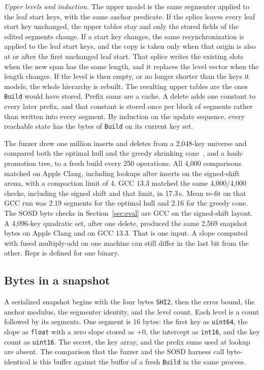 \documentclass[conference]{IEEEtran}
\begin{document}
\emph{Upper levels and induction.}
The upper model is the same segmenter applied to the leaf start keys, with the same anchor predicate.
If the splice leaves every leaf start key unchanged, the upper tables stay and only the stored fields of the edited segments change.
If a start key changes, the same resynchronization is applied to the leaf start keys, and the copy is taken only when that origin is also at or after the first unchanged leaf start.
That splice writes the existing slots when the new span has the same length, and it replaces the level vector when the length changes.
If the level is then empty, or no longer shorter than the keys it models, the whole hierarchy is rebuilt.
The resulting upper tables are the ones \texttt{Build} would have stored.
Prefix sums are a cache. A delete adds one constant to every later prefix, and that constant is stored once per block of segments rather than written into every segment.
By induction on the update sequence, every reachable state has the bytes of \texttt{Build} on its current key set.

The fuzzer drew one million inserts and deletes from a 2{,}048-key universe and compared both the optimal hull and the greedy shrinking cone~\cite{galakatos2019fiting}, and a hash-promotion tree, to a fresh build every 250 operations.
All 4{,}000 comparisons matched on Apple Clang, including lookups after inserts on the signed-shift arena, with a compaction limit of 4.
GCC 13.3 matched the same 4{,}000/4{,}000 checks, including the signed shift and that limit, in 17.3\,s.
Mean re-fit on that GCC run was 2.19 segments for the optimal hull and 2.16 for the greedy cone.
The SOSD byte checks in Section~\ref{sec:eval} are GCC on the signed-shift layout.
A 4{,}096-key quadratic set, after one delete, produced the same 2{,}569 snapshot bytes on Apple Clang and on GCC 13.3.
That is one input.
A slope computed with fused multiply-add on one machine can still differ in the last bit from the other.
$\mathrm{Repr}$ is defined for one binary.

\subsection{Bytes in a snapshot}

A serialized snapshot begins with the four bytes \texttt{SHI2}, then the error bound, the anchor modulus, the segmenter identity, and the level count.
Each level is a count followed by its segments.
One segment is 16 bytes: the first key as \texttt{uint64}, the slope as \texttt{float} with a zero slope stored as $+0$, the intercept as \texttt{int16}, and the key count as \texttt{uint16}.
The secret, the key array, and the prefix sums used at lookup are absent.
The comparison that the fuzzer and the SOSD harness call byte-identical is this buffer against the buffer of a fresh \texttt{Build} in the same process.
\end{document}

